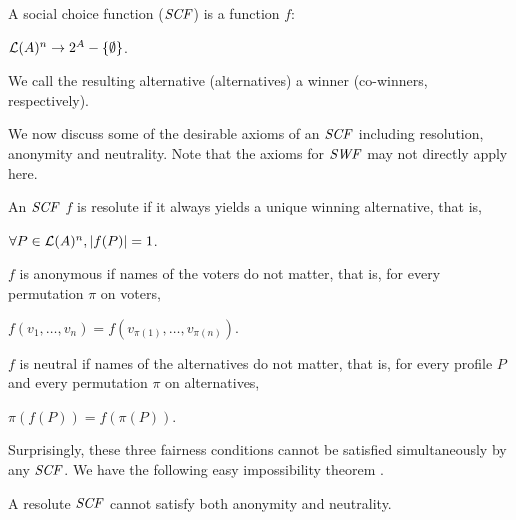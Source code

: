 \begin{definition}
	A social choice function ($\it{SCF}$) is a function $f$:
	\begin{center}
		$\mathcal{L}(A)^n \rightarrow 2^A-\{\emptyset\}$.
	\end{center}
	We call the resulting alternative (alternatives)
	a winner (co-winners, respectively).
\end{definition}

We now discuss some of the desirable axioms of an $\it{SCF}$ including
resolution, anonymity and neutrality.
Note that the axioms for $\it{SWF}$ may not directly apply here.

\begin{definition}
	An $\it{SCF}$ $f$ is resolute if it always yields a unique winning alternative, that is,
	\begin{center}
		$\forall P \in \mathcal{L}(A)^n, |f(P)|=1$.
	\end{center}
	$f$ is anonymous if names of the voters do not matter, that is,
	for every permutation $\pi$ on voters,
	\begin{center}
		$f({v_1,\ldots,v_n}) = f(v_{\pi(1)},\ldots,v_{\pi(n)})$.
	\end{center}
	$f$ is neutral if names of the alternatives do not matter, that is,
	for every profile $P$ and every permutation $\pi$ on alternatives,
	\begin{center}
		$\pi(f(P)) = f(\pi(P))$.
	\end{center}
\end{definition}

Surprisingly, these three fairness conditions cannot be satisfied simultaneously
by any $\it{SCF}$. We have the following easy impossibility theorem \cite{Brandt:COMSOC}.

\begin{thm}
\label{thm:easy}
	A resolute $\it{SCF}$ cannot satisfy both anonymity and neutrality.
\end{thm}
%

